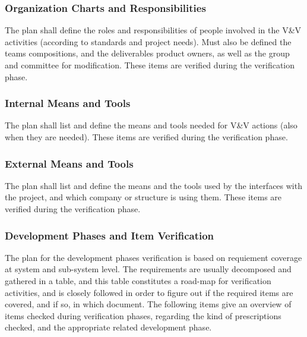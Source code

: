 \documentclass{template/openetcs_report}
\begin{document}
\subsubsection{Organization Charts and Responsibilities} 
The plan shall define the roles and responsibilities of people
involved in the V\&V activities (according to standards and project
needs). Must also be defined the teams compositions, and the
deliverables product owners, as well as the group and committee for
modification.  These items are verified during the verification phase.

\subsubsection{Internal Means and Tools} 
The plan shall list and define the means and tools needed for V\&V
actions (also when they are needed).  These items are verified during
the verification phase.

\subsubsection{External Means and Tools} 
The plan shall list and define the means and the tools used by the
interfaces with the project, and which company or structure is using
them.  These items are verified during the verification phase.

\subsubsection{Development Phases and Item Verification}
The plan for the development phases verification is based on
requiement coverage at system and sub-system level.  The requirements
are usually decomposed and gathered in a table, and this table
constitutes a road-map for verification activities, and is closely
followed in order to figure out if the required items are covered, and
if so, in which document.  The following items give an overview of
items checked during verification phases, regarding the kind of
prescriptions checked, and the appropriate related development phase.
\end{document}
